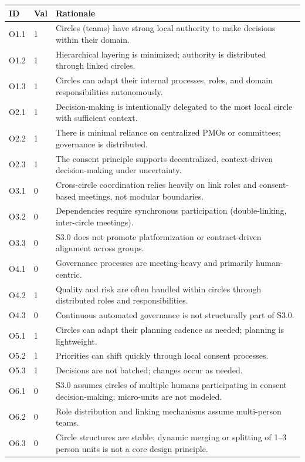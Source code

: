 \documentclass[11pt, a4paper, twocolumn]{article} %
\begin{document}
\begin{table}[h]
\centering
\begingroup\small
\setlength{\tabcolsep}{4pt}%
\begin{tabularx}{\linewidth}{llX}
\toprule
\textbf{ID} & \textbf{Val} & \textbf{Rationale} \\
\midrule
O1.1 & 1 &
Circles (teams) have strong local authority to make decisions within their domain. \\
O1.2 & 1 &
Hierarchical layering is minimized; authority is distributed through linked circles. \\
O1.3 & 1 &
Circles can adapt their internal processes, roles, and domain responsibilities autonomously. \\
\midrule
O2.1 & 1 &
Decision-making is intentionally delegated to the most local circle with sufficient context. \\
O2.2 & 1 &
There is minimal reliance on centralized PMOs or committees; governance is distributed. \\
O2.3 & 1 &
The consent principle supports decentralized, context-driven decision-making under uncertainty. \\
\midrule
O3.1 & 0 &
Cross-circle coordination relies heavily on link roles and consent-based meetings, not modular boundaries. \\
O3.2 & 0 &
Dependencies require synchronous participation (double-linking, inter-circle meetings). \\
O3.3 & 0 &
S3.0 does not promote platformization or contract-driven alignment across groups. \\
\midrule
O4.1 & 0 &
Governance processes are meeting-heavy and primarily human-centric. \\
O4.2 & 1 &
Quality and risk are often handled within circles through distributed roles and responsibilities. \\
O4.3 & 0 &
Continuous automated governance is not structurally part of S3.0. \\
\midrule
O5.1 & 1 &
Circles can adapt their planning cadence as needed; planning is lightweight. \\
O5.2 & 1 &
Priorities can shift quickly through local consent processes. \\
O5.3 & 1 &
Decisions are not batched; changes occur as needed. \\
\midrule
O6.1 & 0 &
S3.0 assumes circles of multiple humans participating in consent decision-making; micro-units are not modeled. \\
O6.2 & 0 &
Role distribution and linking mechanisms assume multi-person teams. \\
O6.3 & 0 &
Circle structures are stable; dynamic merging or splitting of 1--3 person units is not a core design principle. \\
\bottomrule
\end{tabularx}
\endgroup
\end{table}
\end{document}
